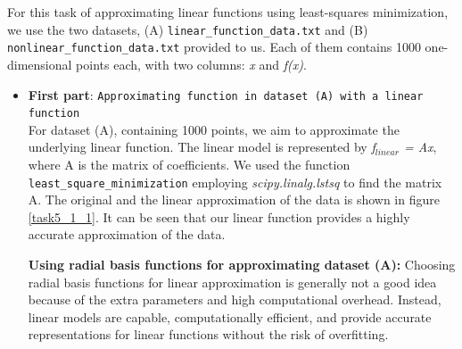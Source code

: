 
For this task of approximating linear functions using least-squares minimization, we use the two datasets, (A) \texttt{linear\_function\_data.txt} and (B) \texttt{nonlinear\_function\_data.txt} provided to us. Each of them contains 1000 one-dimensional points each, with two columns: \textit{x} and \textit{f(x)}.

\begin{itemize}
    \item \textbf{First part}: \texttt{Approximating function in dataset (A) with a linear function}\\
    For dataset (A), containing 1000 points, we aim to approximate the underlying linear function. The linear model is represented by \textit{f$_{linear}$ = Ax}, where A is the matrix of coefficients. We used the function \texttt{least\_square\_minimization} employing \textit{scipy.linalg.lstsq} to find the matrix A. The original and the linear approximation of the data is shown in figure \ref{task5_1_1}. It can be seen that our linear function provides a highly accurate approximation of the data.

    \textbf{Using radial basis functions for approximating dataset (A):} Choosing radial basis functions for linear approximation is generally not a good idea because of the extra parameters and high computational overhead. Instead, linear models are capable, computationally efficient, and provide accurate representations for linear functions without the risk of overfitting.


\end{itemize}
